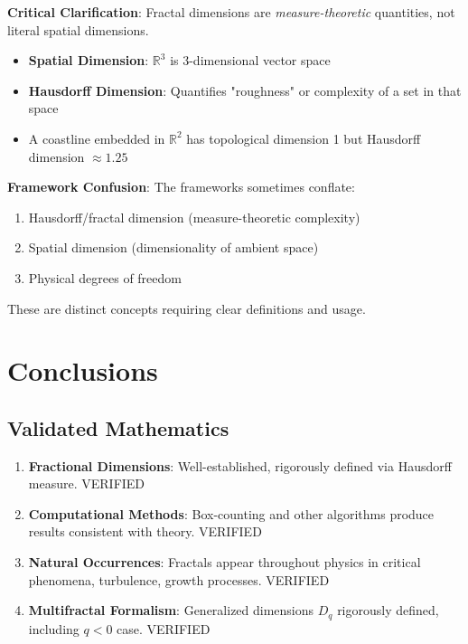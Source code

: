 \textbf{Critical Clarification}: Fractal dimensions are \textit{measure-theoretic} quantities, not literal spatial dimensions.

\begin{itemize}
    \item \textbf{Spatial Dimension}: $\mathbb{R}^3$ is 3-dimensional vector space
    \item \textbf{Hausdorff Dimension}: Quantifies "roughness" or complexity of a set in that space
    \item A coastline embedded in $\mathbb{R}^2$ has topological dimension 1 but Hausdorff dimension $\approx 1.25$
\end{itemize}

\textbf{Framework Confusion}: The frameworks sometimes conflate:
\begin{enumerate}
    \item Hausdorff/fractal dimension (measure-theoretic complexity)
    \item Spatial dimension (dimensionality of ambient space)
    \item Physical degrees of freedom
\end{enumerate}

These are distinct concepts requiring clear definitions and usage.

\section{Conclusions}

\subsection{Validated Mathematics}

\begin{enumerate}
    \item \textbf{Fractional Dimensions}: Well-established, rigorously defined via Hausdorff measure. \textcolor{validcolor}{VERIFIED}

    \item \textbf{Computational Methods}: Box-counting and other algorithms produce results consistent with theory. \textcolor{validcolor}{VERIFIED}

    \item \textbf{Natural Occurrences}: Fractals appear throughout physics in critical phenomena, turbulence, growth processes. \textcolor{validcolor}{VERIFIED}

    \item \textbf{Multifractal Formalism}: Generalized dimensions $D_q$ rigorously defined, including $q < 0$ case. \textcolor{validcolor}{VERIFIED}
\end{enumerate}

